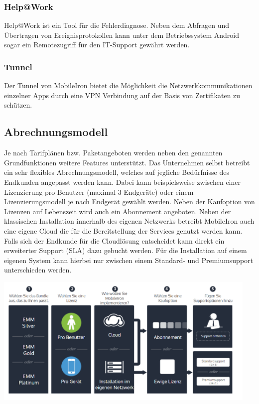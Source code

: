 \subsubsection {Help@Work}
Help@Work ist ein Tool für die Fehlerdiagnose. Neben dem Abfragen und Übertragen von Ereignisprotokollen kann unter dem Betriebssystem Android sogar ein Remotezugriff für den IT-Support gewährt werden. 
\subsubsection {Tunnel}
Der Tunnel von MobileIron bietet die Möglichkeit die Netzwerkkommunikationen einzelner Apps durch eine VPN Verbindung auf der Basis von Zertifikaten zu schützen.

\subsection {Abrechnungsmodell}

Je nach Tarifplänen bzw. Paketangeboten werden neben den genannten Grundfunktionen weitere Features unterstützt. Das Unternehmen selbst betreibt ein sehr flexibles Abrechnungsmodell, welches auf jegliche Bedürfnisse des Endkunden angepasst werden kann. Dabei kann beispielsweise zwischen einer Lizenzierung pro Benutzer (maximal 3 Endgeräte) oder einem Lizenzierungsmodell je nach Endgerät gewählt werden. Neben der Kaufoption von Lizenzen auf Lebenszeit wird auch ein Abonnement angeboten. Neben der klassischen Installation innerhalb des eigenen Netzwerks betreibt MobileIron auch eine eigene Cloud die für die Bereitstellung der Services genutzt werden kann. Falls sich der Endkunde für die Cloudlösung entscheidet kann direkt ein erweiterter Support (SLA) dazu gebucht werden. Für die Installation auf einem eigenen System kann hierbei nur zwischen einem Standard- und Premiumsupport unterschieden werden.  

\includegraphics[width=0.95\textwidth]{Bilder/mi_2.png} 